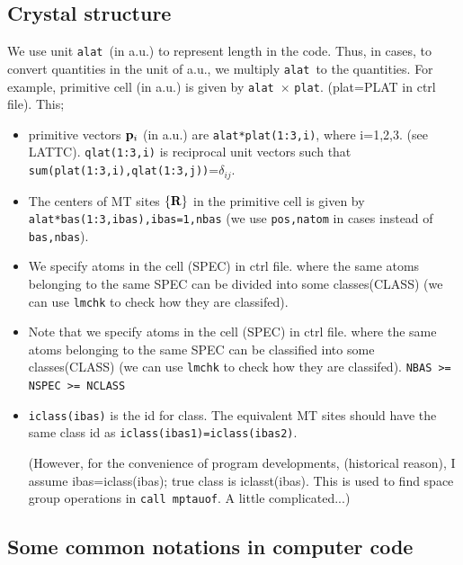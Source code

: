 \documentclass[a4paper,10pt,epsf,fleqn]{article}
\def\bfp{{\bf p}}
\newcommand{\bfR}{{\bf R}}
\newcommand{\io}[1]{{\sf  #1}}
\newcommand{\raw}[1]{{\tt #1}}
\newcommand{\alat}{{\raw{alat}}}
\newcommand{\plat}{{\raw{plat}}}
\begin{document}
\subsection{Crystal structure}
\label{how to represent crystalstructure and symmetry}
We use unit \alat\ (in a.u.) to represent length in the code.
Thus, in cases, to convert quantities in the unit of a.u., we
multiply \alat\ to the quantities.
For example, primitive cell (in a.u.) is given by 
\alat\ $\times$ \plat. (plat=PLAT in ctrl file).
This;
\begin{itemize}
\item
primitive vectors $\bfp_i$ (in a.u.) are
\raw{alat*plat(1:3,i)}, where i=1,2,3. (see \io{LATTC}).
\raw{qlat(1:3,i)} is reciprocal unit vectors such that
\raw{sum(plat(1:3,i),qlat(1:3,j))}=$\delta_{ij}$.
\item
The centers of MT sites $\{\bfR\}$ in the primitive cell
is given by \raw{alat*bas(1:3,ibas),ibas=1,nbas} 
(we use \verb#pos,natom# in cases instead of \verb#bas,nbas#). 

\item
  We specify atoms in the cell (SPEC) in ctrl file.
  where the same atoms belonging to the same SPEC can be
  divided into some classes(CLASS)
  (we can use \raw{lmchk} to check how they are classifed).

 \item
  Note that we specify atoms in the cell (SPEC) in ctrl file.
  where the same atoms belonging to the same SPEC can be
  classified into some classes(CLASS)
  (we can use \raw{lmchk} to check how they are classifed).
  \raw{NBAS >= NSPEC >= NCLASS}
\item
\verb#iclass(ibas)# is the id for class. The equivalent
MT sites should have the same class id as \verb#iclass(ibas1)=iclass(ibas2)#. 

(However, for the convenience of program developments,
(historical reason), I assume ibas=iclass(ibas); true class
is iclasst(ibas). This is used to find space group operations
in \verb#call mptauof#. A little complicated...)

  
\end{itemize}

\subsection{Some common notations in computer code}
\end{document}
